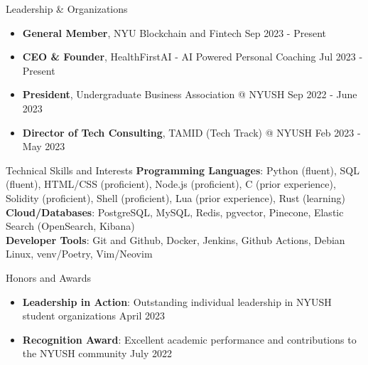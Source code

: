 \documentclass{resume} %
\begin{document}
\begin{rSection}{Leadership \& Organizations}
	\begin{itemize}
		\item \textbf{General Member}{, NYU Blockchain and Fintech} \hfill Sep 2023 - Present
		\item \textbf{CEO \& Founder}{, HealthFirstAI - AI Powered Personal Coaching} \hfill Jul 2023 - Present
		\item \textbf{President}{, Undergraduate Business Association @ NYUSH} \hfill Sep 2022 - June 2023
		\item \textbf{Director of Tech Consulting}{, TAMID (Tech Track) @ NYUSH} \hfill Feb 2023 - May 2023
	\end{itemize}
\end{rSection}


\begin{rSection}{Technical Skills and Interests}
	\textbf{Programming Languages}{: Python (fluent), SQL (fluent), HTML/CSS (proficient), Node.js (proficient), C (prior experience), Solidity (proficient), Shell  (proficient), Lua (prior experience), Rust (learning)} \\
	\textbf{Cloud/Databases}{: PostgreSQL, MySQL, Redis, pgvector, Pinecone, Elastic Search (OpenSearch, Kibana)} \\
	\textbf{Developer Tools}{: Git and Github, Docker, Jenkins, Github Actions, Debian Linux, venv/Poetry, Vim/Neovim}
\end{rSection}


\begin{rSection}{Honors and Awards}
	\begin{itemize}
		\item \textbf{Leadership in Action}{: Outstanding individual leadership in NYUSH student organizations} \hfill April 2023
		\item \textbf{Recognition Award}{: Excellent academic performance and contributions to the NYUSH community} \hfill July 2022
	\end{itemize}
\end{rSection}
\end{document}
